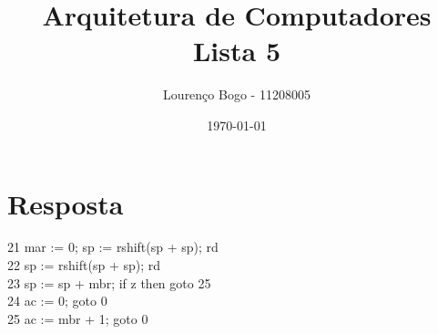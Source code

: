 \documentclass[11pt]{article}
\author{Lourenço Bogo - 11208005}
\date{\today}
\title{Arquitetura de Computadores Lista 5}
\begin{document}
\maketitle

\section{Resposta}
\label{sec:orgc5293fa}
21 mar := 0; sp := rshift(sp + sp); rd\\
22 sp := rshift(sp + sp); rd\\
23 sp := sp + mbr; if z then goto 25\\
24 ac := 0; goto 0\\
25 ac := mbr + 1; goto 0\\
\end{document}

